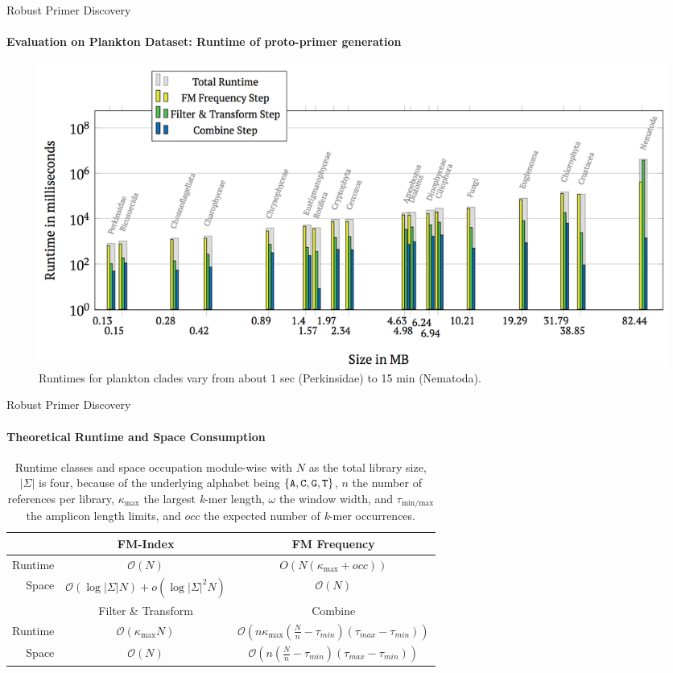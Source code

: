 \documentclass[xcolor=dvipsnames,envcountsect]{beamer}
\newcommand\Tstrut{\rule{0pt}{2.6ex}}         %
\newcommand{\adenine}{{\tt A}}
\newcommand{\cytosine}{{\tt C}}
\newcommand{\guanine}{{\tt G}}
\newcommand{\thymine}{{\tt T}}
\newcommand\kmer{{\it k}-mer}
\begin{document}
\begin{frame}{Robust Primer Discovery}
\framesubtitle{Evaluation on Plankton Dataset: Runtime of proto-primer generation}
\begin{figure}\centering
    \includegraphics[scale=.36]{plankton_runtime}
    \caption{Runtimes for plankton clades vary from about 1 sec (Perkinsidae) to 15 min (Nematoda).}
\end{figure}
\end{frame}

\begin{frame}{Robust Primer Discovery}
\framesubtitle{Theoretical Runtime and Space Consumption}
\begin{table}[htpb]\centering
\begin{tabular}{@{}rcc@{}}\toprule
&       FM-Index & FM Frequency\\ \midrule
Runtime & $\mathcal{O}(N)$ & $O(N(\kappa_{\max} + occ))$ \\\Tstrut
Space   & $\mathcal{O}(\log |\Sigma| N) + o(\log|\Sigma|^2N)$ & $\mathcal{O}(N)$ \\
\toprule
 & Filter \& Transform & Combine \\ \midrule
Runtime & $\mathcal{O}(\kappa_{\max}N)$ & $\mathcal{O}(n\kappa_{\max}(\frac{N}{n} - \tau_{min})(\tau_{max} - \tau_{min}))$ \\
Space & $\mathcal{O}(N)$ & $\mathcal{O}(n(\frac{N}{n} - \tau_{min})(\tau_{max} - \tau_{min}))$ \\
\bottomrule
\end{tabular}
\caption{Runtime classes and space occupation module-wise with $N$ as the total library size, $|\Sigma|$ is four, because of the underlying alphabet being $\{ \adenine , \cytosine, \guanine, \thymine \}$, $n$ the number of references per library, $\kappa_{\max}$ the largest \kmer{} length, $\omega$ the window width, and $\tau_{\text{min/max}}$ the amplicon length limits, and $occ$ the expected number of \kmer{} occurrences.} \label{Tab:runtimes2}
\end{table}
\end{frame}
\end{document}
